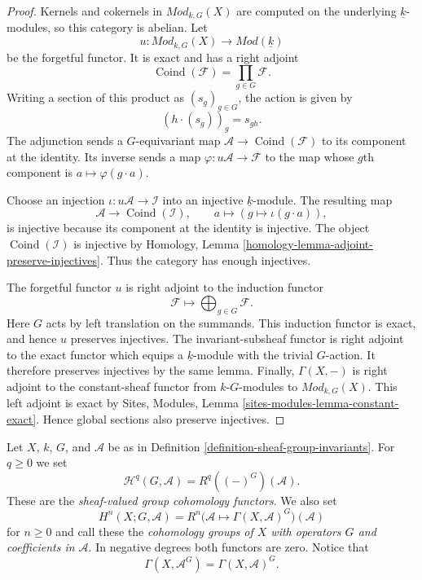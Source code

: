 \begin{proof}
Kernels and cokernels in $\textit{Mod}_{k, G}(X)$ are computed on the
underlying $\underline{k}$-modules, so this category is abelian. Let
$$
u : \textit{Mod}_{k, G}(X) \longrightarrow
\textit{Mod}(\underline{k})
$$
be the forgetful functor. It is exact and has a right adjoint
$$
\operatorname{Coind}(\mathcal{F}) = \prod_{g \in G}\mathcal{F}.
$$
Writing a section of this product as $(s_g)_{g \in G}$, the action is
given by
$$
(h \cdot (s_g))_g = s_{gh}.
$$
The adjunction sends a $G$-equivariant map
$\mathcal{A} \to \operatorname{Coind}(\mathcal{F})$ to its component at
the identity. Its inverse sends a map $\varphi : u\mathcal{A} \to
\mathcal{F}$ to the map whose $g$th component is
$a \mapsto \varphi(g \cdot a)$.

Choose an injection $\iota : u\mathcal{A} \to \mathcal{I}$ into an injective
$\underline{k}$-module. The resulting map
$$
\mathcal{A} \longrightarrow \operatorname{Coind}(\mathcal{I}),
\qquad
a \longmapsto (g \mapsto \iota(g \cdot a)),
$$
is injective because its component at the identity is injective.
The object $\operatorname{Coind}(\mathcal{I})$ is injective by Homology,
Lemma \ref{homology-lemma-adjoint-preserve-injectives}. Thus the category has
enough injectives.

The forgetful functor $u$ is right adjoint to the induction functor
$$
\mathcal{F} \longmapsto \bigoplus_{g \in G}\mathcal{F}.
$$
Here $G$ acts by left translation on the summands. This induction functor
is exact, and hence $u$ preserves injectives. The
invariant-subsheaf functor is right adjoint to the exact functor which equips
a $\underline{k}$-module with the trivial $G$-action. It therefore preserves
injectives by the same lemma. Finally, $\Gamma(X, -)$ is right adjoint to the
constant-sheaf functor from $k\text{-}G$-modules to
$\textit{Mod}_{k, G}(X)$. This left adjoint is exact by Sites, Modules,
Lemma \ref{sites-modules-lemma-constant-exact}. Hence global sections also
preserve injectives.
\end{proof}

\begin{definition}
\label{definition-sheaf-group-operator-cohomology}
\begin{reference}
\cite[Chapter IV, \S 4.4, p. 194]{Tohoku}
\end{reference}
Let $X$, $k$, $G$, and $\mathcal{A}$ be as in Definition
\ref{definition-sheaf-group-invariants}. For $q \geq 0$ we set
$$
\mathcal{H}^q(G, \mathcal{A}) = R^q((-)^G)(\mathcal{A}).
$$
These are the \emph{sheaf-valued group cohomology functors}. We also set
$$
H^n(X; G, \mathcal{A}) =
R^n\bigl(\mathcal{A} \longmapsto \Gamma(X, \mathcal{A})^G\bigr)
(\mathcal{A})
$$
for $n \geq 0$ and call these the \emph{cohomology groups of $X$ with
operators $G$ and coefficients in $\mathcal{A}$}. In negative degrees both
functors are zero. Notice that
$$
\Gamma(X, \mathcal{A}^G) = \Gamma(X, \mathcal{A})^G.
$$
\end{definition}

